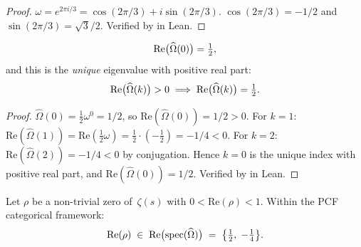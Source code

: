 \begin{proof}
$\omega = e^{2\pi i/3} = \cos(2\pi/3) + i\sin(2\pi/3)$.
$\cos(2\pi/3) = -1/2$ and $\sin(2\pi/3) = \sqrt{3}/2$.
Verified by  in Lean.
\end{proof}


\begin{proposition}\label{prop:Omega-hat-re}
\begin{equation}\label{eq:Omega-hat-0-re}
  \mathrm{Re}\bigl(\widehat{\Omega}(0)\bigr) = \tfrac{1}{2},
\end{equation}
and this is the \emph{unique} eigenvalue with positive real part:
\begin{equation}\label{eq:Omega-hat-unique-positive-re}
  \mathrm{Re}\bigl(\widehat{\Omega}(k)\bigr) > 0 \implies
  \mathrm{Re}\bigl(\widehat{\Omega}(k)\bigr) = \tfrac{1}{2}.
\end{equation}
\end{proposition}

\begin{proof}
$\widehat{\Omega}(0) = \tfrac{1}{2}\omega^0 = 1/2$, so
$\mathrm{Re}(\widehat{\Omega}(0)) = 1/2 > 0$.
For $k=1$: $\mathrm{Re}(\widehat{\Omega}(1)) = \mathrm{Re}(\tfrac{1}{2}\omega) =
\tfrac{1}{2}\cdot(-\tfrac{1}{2}) = -1/4 < 0$.
For $k=2$: $\mathrm{Re}(\widehat{\Omega}(2)) = -1/4 < 0$ by conjugation.
Hence $k=0$ is the unique index with positive real part, and
$\mathrm{Re}(\widehat{\Omega}(0)) = 1/2$.
Verified by  in Lean.
\end{proof}


\begin{proposition}\label{prop:spectral-embedding}
Let $\rho$ be a non-trivial zero of~$\zeta(s)$ with
$0<\mathrm{Re}(\rho)<1$.  Within the PCF categorical framework:
\begin{equation}\label{eq:spectral-embedding}
  \mathrm{Re}(\rho) \;\in\;
  \mathrm{Re}\bigl(\mathrm{spec}(\widehat{\Omega})\bigr)
  \;=\; \bigl\{\tfrac{1}{2},\; -\tfrac{1}{4}\bigr\}.
\end{equation}
\end{proposition}

